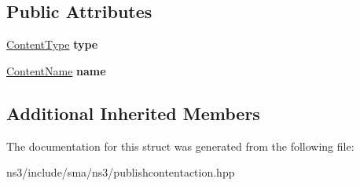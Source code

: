 \subsection*{Public Attributes}
\begin{DoxyCompactItemize}
\item 
\hypertarget{structsma_1_1PublishContentAction_ae5b2112334ca7f33d2bea545d239bd64}{\hyperlink{structsma_1_1ContentType}{Content\-Type} {\bfseries type}}\label{structsma_1_1PublishContentAction_ae5b2112334ca7f33d2bea545d239bd64}

\item 
\hypertarget{structsma_1_1PublishContentAction_ac90f30bde714e1bc532573a52eae8e28}{\hyperlink{structsma_1_1ContentName}{Content\-Name} {\bfseries name}}\label{structsma_1_1PublishContentAction_ac90f30bde714e1bc532573a52eae8e28}

\end{DoxyCompactItemize}
\subsection*{Additional Inherited Members}


The documentation for this struct was generated from the following file\-:\begin{DoxyCompactItemize}
\item 
ns3/include/sma/ns3/publishcontentaction.\-hpp\end{DoxyCompactItemize}
